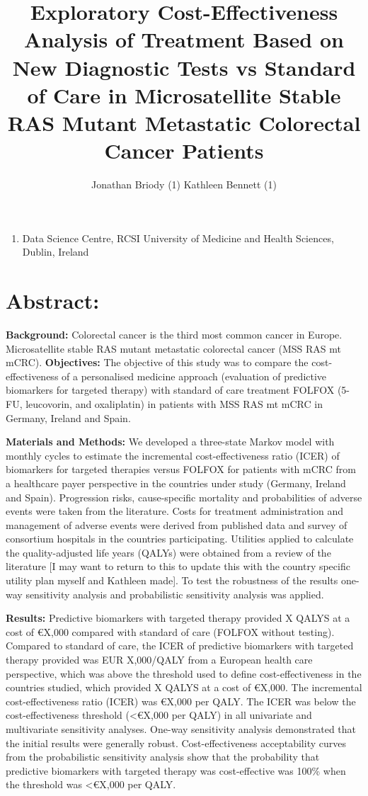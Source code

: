 \documentclass[
]{article}
\title{Exploratory Cost-Effectiveness Analysis of Treatment Based on New
Diagnostic Tests vs Standard of Care in Microsatellite Stable RAS Mutant
Metastatic Colorectal Cancer Patients}
\author{Jonathan Briody (1) \textbar{} Kathleen Bennett (1)}
\date{}
\providecommand{\tightlist}{%
  \setlength{\itemsep}{0pt}\setlength{\parskip}{0pt}}
\begin{document}
\maketitle

\begin{enumerate}
\def\labelenumi{(\arabic{enumi})}
\tightlist
\item
  Data Science Centre, RCSI University of Medicine and Health Sciences,
  Dublin, Ireland
\end{enumerate}

\hypertarget{abstract}{%
\section{\texorpdfstring{\textbf{Abstract:}}{Abstract:}}\label{abstract}}

\textbf{Background:} Colorectal cancer is the third most common cancer
in Europe. Microsatellite stable RAS mutant metastatic colorectal cancer
(MSS RAS mt mCRC). \textbf{Objectives:} The objective of this study was
to compare the cost-effectiveness of a personalised medicine approach
(evaluation of predictive biomarkers for targeted therapy) with standard
of care treatment FOLFOX (5-FU, leucovorin, and oxaliplatin) in patients
with MSS RAS mt mCRC in Germany, Ireland and Spain.

\textbf{Materials and Methods:} We developed a three-state Markov model
with monthly cycles to estimate the incremental cost-effectiveness ratio
(ICER) of biomarkers for targeted therapies versus FOLFOX for patients
with mCRC from a healthcare payer perspective in the countries under
study (Germany, Ireland and Spain). Progression risks, cause-specific
mortality and probabilities of adverse events were taken from the
literature. Costs for treatment administration and management of adverse
events were derived from published data and survey of consortium
hospitals in the countries participating. Utilities applied to calculate
the quality-adjusted life years (QALYs) were obtained from a review of
the literature {[}I may want to return to this to update this with the
country specific utility plan myself and Kathleen made{]}. To test the
robustness of the results one-way sensitivity analysis and probabilistic
sensitivity analysis was applied.

\textbf{Results:} Predictive biomarkers with targeted therapy provided X
QALYS at a cost of €X,000 compared with standard of care (FOLFOX without
testing). Compared to standard of care, the ICER of predictive
biomarkers with targeted therapy provided was EUR X,000/QALY from a
European health care perspective, which was above the threshold used to
define cost-effectiveness in the countries studied, which provided X
QALYS at a cost of €X,000. The incremental cost-effectiveness ratio
(ICER) was €X,000 per QALY. The ICER was below the cost-effectiveness
threshold (\textless€X,000 per QALY) in all univariate and multivariate
sensitivity analyses. One-way sensitivity analysis demonstrated that the
initial results were generally robust. Cost-effectiveness acceptability
curves from the probabilistic sensitivity analysis show that the
probability that predictive biomarkers with targeted therapy was
cost-effective was 100\% when the threshold was \textless€X,000 per
QALY.
\end{document}

